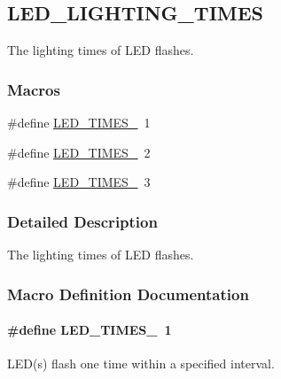 \hypertarget{group___l_e_d___l_i_g_h_t_i_n_g___t_i_m_e_s}{}\subsection{L\+E\+D\+\_\+\+L\+I\+G\+H\+T\+I\+N\+G\+\_\+\+T\+I\+M\+ES}
\label{group___l_e_d___l_i_g_h_t_i_n_g___t_i_m_e_s}


The lighting times of L\+ED flashes.  


\subsubsection*{Macros}
\begin{DoxyCompactItemize}
\item 
\#define \hyperlink{group___l_e_d___l_i_g_h_t_i_n_g___t_i_m_e_s_ga60cc1e6fd28836803bc34a6a7b903964}{L\+E\+D\+\_\+\+T\+I\+M\+E\+S\+\_}~1
\item 
\#define \hyperlink{group___l_e_d___l_i_g_h_t_i_n_g___t_i_m_e_s_ga8e63cf904892c46960392411038fec8d}{L\+E\+D\+\_\+\+T\+I\+M\+E\+S\+\_}~2
\item 
\#define \hyperlink{group___l_e_d___l_i_g_h_t_i_n_g___t_i_m_e_s_gaf2aa0de625adbb45e597afe0131fd356}{L\+E\+D\+\_\+\+T\+I\+M\+E\+S\+\_}~3
\end{DoxyCompactItemize}


\subsubsection{Detailed Description}
The lighting times of L\+ED flashes. 



\subsubsection{Macro Definition Documentation}
\paragraph[{\texorpdfstring{L\+E\+D\+\_\+\+T\+I\+M\+E\+S\+\_\+1}{LED_TIMES_1}}]{\setlength{\rightskip}{0pt plus 5cm}\#define L\+E\+D\+\_\+\+T\+I\+M\+E\+S\+\_~1}\hypertarget{group___l_e_d___l_i_g_h_t_i_n_g___t_i_m_e_s_ga60cc1e6fd28836803bc34a6a7b903964}{}\label{group___l_e_d___l_i_g_h_t_i_n_g___t_i_m_e_s_ga60cc1e6fd28836803bc34a6a7b903964}
L\+E\+D(s) flash one time within a specified interval. 
